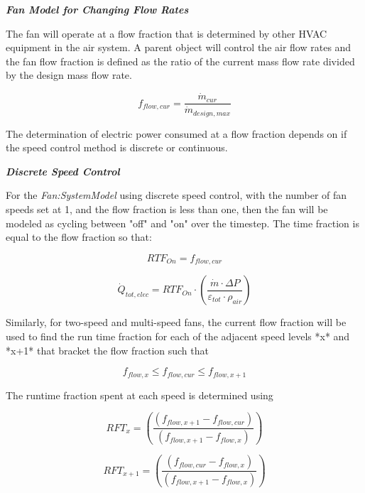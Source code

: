\emph{\textbf{Fan Model for Changing Flow Rates}}

The fan will operate at a flow fraction that is determined by other HVAC equipment in the air system.  A parent object will control the air flow rates and the fan flow fraction is defined as the ratio of the current mass flow rate divided by the design mass flow rate.

\begin{equation}
{f_{flow, cur}} = \frac{\dot m_{cur}}{\dot m_{design,max}}
\end{equation}

The determination of electric power consumed at a flow fraction depends on if the speed control method is discrete or continuous.

\emph{\textbf{Discrete Speed Control}}

For the \emph{Fan:SystemModel} using discrete speed control, with the number of fan speeds set at 1, and the flow fraction is less than one, then the fan will be modeled as cycling between "off" and "on" over the timestep.  The time fraction is equal to the flow fraction so that:
 
\begin{equation}
{RTF_{On}} = {f_{flow, cur}}
\end{equation}

\begin{equation}
{\dot Q_{tot,elec}} = {RTF_{On}} \cdot \left( \frac{\dot m\cdot \Delta P}{{\varepsilon_{tot}}\cdot {\rho_{air}}}\right)
\end{equation}

Similarly, for two-speed and multi-speed fans, the current flow fraction will be used to find the run time fraction for each of the adjacent speed levels *x* and *x+1* that bracket the flow fraction such that

\begin{equation}
{f_{flow,x}} \leq {f_{flow, cur}} \leq {f_{flow,x+1}}
\end{equation}

The runtime fraction spent at each speed is determined using

\begin{equation}
{RFT_{x}} = \left( \frac{({f_{flow,x+1}} - {f_{flow, cur}} )}{({f_{flow,x+1}} - {f_{flow,x}})}  \right)
\end{equation}

\begin{equation}
{RFT_{x+1}} = \left( \frac{({f_{flow, cur}} - {f_{flow,x}} )}{({f_{flow,x+1}} - {f_{flow,x}})}  \right)
\end{equation}


